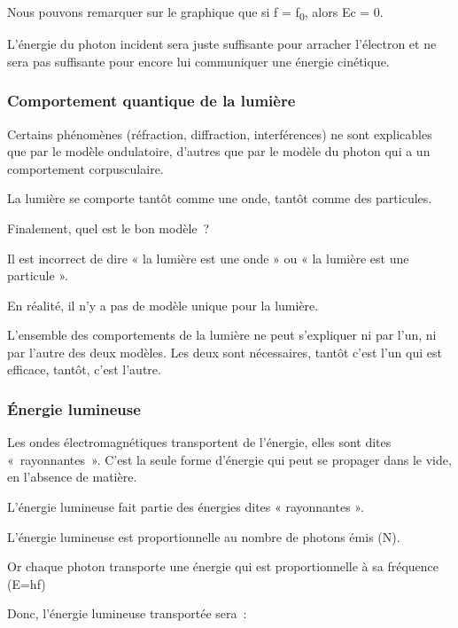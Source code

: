 Nous pouvons remarquer sur le graphique que si f = f\textsubscript{0},
alors Ec = 0.

L'énergie du photon incident sera juste suffisante pour arracher
l'électron et ne sera pas suffisante pour encore lui communiquer une
énergie cinétique.

\subsubsection{Comportement quantique de la lumière}

Certains phénomènes (réfraction, diffraction, interférences) ne sont
explicables que par le modèle ondulatoire, d'autres que par le modèle du
photon qui a un comportement corpusculaire.

La lumière se comporte tantôt comme une onde, tantôt comme des
particules.

Finalement, quel est le bon modèle~?

Il est incorrect de dire « la lumière est une onde » ou « la lumière est
une particule ».

En réalité, il n'y a pas de modèle unique pour la lumière.

L'ensemble des comportements de la lumière ne peut s'expliquer ni par
l'un, ni par l'autre des deux modèles. Les deux sont nécessaires, tantôt
c'est l'un qui est efficace, tantôt, c'est l'autre.

\subsubsection{Énergie lumineuse}

Les ondes électromagnétiques transportent de l'énergie, elles sont dites
«~rayonnantes~». C'est la seule forme d'énergie qui peut se propager
dans le vide, en l'absence de matière.

L'énergie lumineuse fait partie des énergies dites « rayonnantes ».

L'énergie lumineuse est proportionnelle au nombre de photons émis (N).

Or chaque photon transporte une énergie qui est proportionnelle à sa
fréquence (E=hf)

Donc, l'énergie lumineuse transportée sera~:

